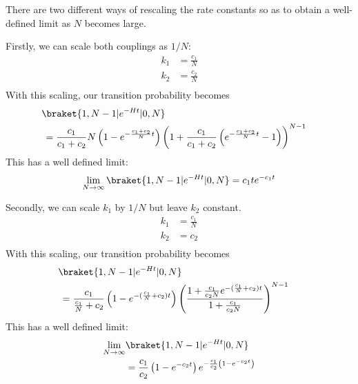 {There are two different ways of rescaling the rate constants so as to obtain a well-defined limit as $N$ becomes large.


Firstly, we can scale both couplings as $1/N$:
\begin{align*}
k_1 &= \frac{c_1}{N} \\
k_2 &= \frac{c_2}{N} \\
\end{align*}
With this scaling, our transition probability becomes
\begin{align*}
 &\!\braket{1, N-1 | e^{-Ht} | 0, N} \cr &=
 \frac{c_1}{c_1 + c_2} N \left( 1 - e^{-\frac{c_1 + c_2}{N} t} \right)
 \left( 1 + \frac{c_1}{c_1 + c_2} \left( e^{-\frac{c_1 + c_2}{N} t} - 1 \right) \right)^{N-1}
\end{align*}
This has a well defined limit:
\begin{align*}
 \lim_{N \to \infty} \braket{1, N-1 | e^{-Ht} | 0, N} =
 c_1 t e^{-c_1 t}
\end{align*}


Secondly, we can scale $k_1$ by $1/N$  but leave $k_2$ constant.
\begin{align*}
k_1 &= \frac{c_1}{N} \\
k_2 &= c_2 \\
\end{align*}
With this scaling, our transition probability becomes
\begin{align*}
 &\!\braket{1, N-1 | e^{-Ht} | 0, N} \cr &=
 \frac{c_1}{\frac{c_1}{N} + c_2}
 \left( 1 - e^{-(\frac{c_1}{N} + c_2) t} \right)
 \left( \frac{1 + \frac{c_1}{c_2 N} e^{-(\frac{c_1}{N} + c_2) t}}{1 + \frac{c_1}{c_2 N}} \right)^{N-1}
\end{align*}
This has a well defined limit:
\begin{align*}
 \lim_{N \to \infty} &\braket{1, N-1 | e^{-Ht} | 0, N} \\ &=
 \frac{c_1}{c_2}
 \left( 1 - e^{-c_2 t} \right)
 e^{- \frac{c_1}{c_2} \left( 1 - e^{-c_2 t} \right)}
\end{align*}


}

